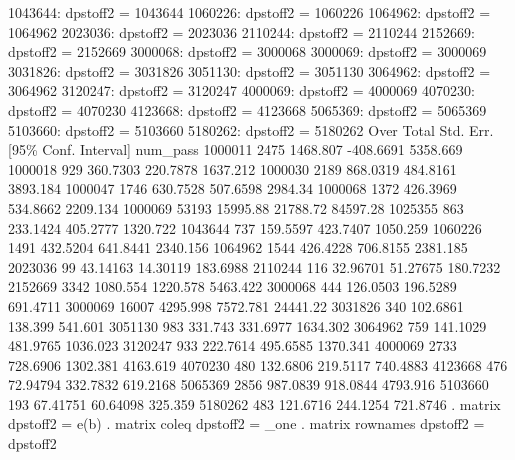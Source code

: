       1043644: dpstoff2 = 1043644
      1060226: dpstoff2 = 1060226
      1064962: dpstoff2 = 1064962
      2023036: dpstoff2 = 2023036
      2110244: dpstoff2 = 2110244
      2152669: dpstoff2 = 2152669
      3000068: dpstoff2 = 3000068
      3000069: dpstoff2 = 3000069
      3031826: dpstoff2 = 3031826
      3051130: dpstoff2 = 3051130
      3064962: dpstoff2 = 3064962
      3120247: dpstoff2 = 3120247
      4000069: dpstoff2 = 4000069
      4070230: dpstoff2 = 4070230
      4123668: dpstoff2 = 4123668
      5065369: dpstoff2 = 5065369
      5103660: dpstoff2 = 5103660
      5180262: dpstoff2 = 5180262
{\smallskip}
        Over {\VBAR}      Total   Std. Err.     [95\% Conf. Interval]
num_pass     {\VBAR}
     1000011 {\VBAR}       2475   1468.807     -408.6691    5358.669
     1000018 {\VBAR}        929   360.7303      220.7878    1637.212
     1000030 {\VBAR}       2189   868.0319      484.8161    3893.184
     1000047 {\VBAR}       1746   630.7528      507.6598     2984.34
     1000068 {\VBAR}       1372   426.3969      534.8662    2209.134
     1000069 {\VBAR}      53193   15995.88      21788.72    84597.28
     1025355 {\VBAR}        863   233.1424      405.2777    1320.722
     1043644 {\VBAR}        737   159.5597      423.7407    1050.259
     1060226 {\VBAR}       1491   432.5204      641.8441    2340.156
     1064962 {\VBAR}       1544   426.4228      706.8155    2381.185
     2023036 {\VBAR}         99   43.14163      14.30119    183.6988
     2110244 {\VBAR}        116   32.96701      51.27675    180.7232
     2152669 {\VBAR}       3342   1080.554      1220.578    5463.422
     3000068 {\VBAR}        444   126.0503      196.5289    691.4711
     3000069 {\VBAR}      16007   4295.998      7572.781    24441.22
     3031826 {\VBAR}        340   102.6861       138.399     541.601
     3051130 {\VBAR}        983    331.743      331.6977    1634.302
     3064962 {\VBAR}        759   141.1029      481.9765    1036.023
     3120247 {\VBAR}        933   222.7614      495.6585    1370.341
     4000069 {\VBAR}       2733   728.6906      1302.381    4163.619
     4070230 {\VBAR}        480   132.6806      219.5117    740.4883
     4123668 {\VBAR}        476   72.94794      332.7832    619.2168
     5065369 {\VBAR}       2856   987.0839      918.0844    4793.916
     5103660 {\VBAR}        193   67.41751      60.64098     325.359
     5180262 {\VBAR}        483   121.6716      244.1254    721.8746
{\smallskip}
. matrix dpstoff2 = e(b)
{\smallskip}
. matrix coleq dpstoff2 = _one
{\smallskip}
. matrix rownames dpstoff2 = dpstoff2
{\smallskip}
